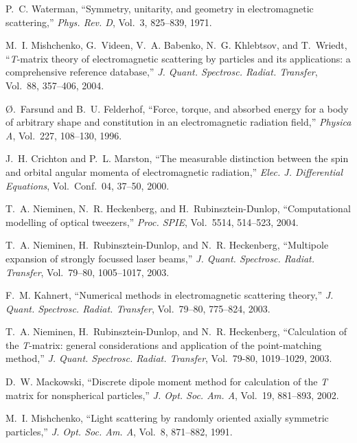\documentclass{article}
\begin{document}
\begin{thebibliography}{99}

P.~C. Waterman, ``Symmetry, unitarity, and geometry in electromagnetic
  scattering,'' {\em Phys. Rev. D}, Vol.~3, 825--839, 1971.

M.~I. Mishchenko, G.~Videen, V.~A. Babenko, N.~G. Khlebtsov, and T.~Wriedt,
  ``{\textit{T}}-matrix theory of electromagnetic scattering by particles and
  its applications: a comprehensive reference database,'' {\em J. Quant.
  Spectrosc. Radiat. Transfer}, Vol.~88, 357--406, 2004.

{\O}.~Farsund and B.~U. Felderhof, ``Force, torque, and absorbed energy for a
  body of arbitrary shape and constitution in an electromagnetic radiation
  field,'' {\em Physica A}, Vol.~227, 108--130, 1996.

J.~H. Crichton and P.~L. Marston, ``The measurable distinction between the spin
  and orbital angular momenta of electromagnetic radiation,'' {\em Elec.
  J. Differential Equations}, Vol.~Conf.~04, 37--50, 2000.

T.~A. Nieminen, N.~R. Heckenberg, and H.~Rubinsztein-Dunlop, ``Computational
  modelling of optical tweezers,'' {\em Proc. SPIE}, Vol.~5514, 514--523,
  2004.

T.~A. Nieminen, H.~Rubinsztein-Dunlop, and N.~R. Heckenberg, ``Multipole
  expansion of strongly focussed laser beams,'' {\em J. Quant. Spectrosc.
  Radiat. Transfer}, Vol.~79--80, 1005--1017, 2003.

F.~M. Kahnert, ``Numerical methods in electromagnetic scattering theory,'' {\em
  J. Quant. Spectrosc. Radiat. Transfer}, Vol.~79--80, 775--824, 2003.

T.~A. Nieminen, H.~Rubinsztein-Dunlop, and N.~R. Heckenberg, ``Calculation of
  the {\textit{T}}-matrix: general considerations and application of the
  point-matching method,'' {\em J. Quant. Spectrosc. Radiat. Transfer},
  Vol.~79-80, 1019--1029, 2003.

D.~W. Mackowski, ``Discrete dipole moment method for calculation of the
  {\textit{T}} matrix for nonspherical particles,'' {\em J. Opt. Soc. Am. A},
  Vol.~19, 881--893, 2002.

M.~I. Mishchenko, ``Light scattering by randomly oriented axially symmetric
  particles,'' {\em J. Opt. Soc. Am. A}, Vol.~8,
  871--882, 1991.


\end{thebibliography}
\end{document}
